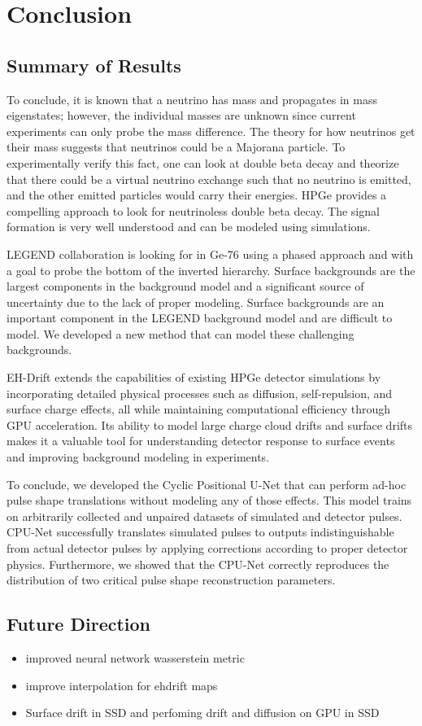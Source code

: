 \chapter{Conclusion}
\section{Summary of Results}
To conclude, it is known that a neutrino has mass and propagates in mass eigenstates; however, the individual masses are unknown since current experiments can only probe the mass difference. The theory for how neutrinos get their mass suggests that neutrinos could be a Majorana particle. To experimentally verify this fact, one can look at double beta decay and theorize that there could be a virtual neutrino exchange such that no neutrino is emitted, and the other emitted particles would carry their energies. HPGe provides a compelling approach to look for neutrinoless double beta decay. The signal formation is very well understood and can be modeled using simulations.

LEGEND collaboration is looking for {\onbb} in Ge-76 using a phased approach and with a goal to probe the bottom of the inverted hierarchy. Surface backgrounds are the largest components in the background model and a significant source of uncertainty due to the lack of proper modeling. Surface backgrounds are an important component in the LEGEND background model and are difficult to model. We developed a new method that can model these challenging backgrounds.

EH-Drift extends the capabilities of existing HPGe detector simulations by incorporating detailed physical processes such as diffusion, self-repulsion, and surface charge effects, all while maintaining computational efficiency through GPU acceleration. Its ability to model large charge cloud drifts and surface drifts makes it a valuable tool for understanding detector response to surface events and improving background modeling in experiments.


To conclude, we developed the Cyclic Positional U-Net that can perform ad-hoc pulse shape translations without modeling any of those effects. This model trains on arbitrarily collected and unpaired datasets of simulated and detector pulses. CPU-Net successfully translates simulated pulses to outputs indistinguishable from actual detector pulses by applying corrections according to proper detector physics. Furthermore, we showed that the CPU-Net correctly reproduces the distribution of two critical pulse shape reconstruction parameters. 


\section{Future Direction}
\begin{itemize}
    \item improved neural network wasserstein metric
    \item improve interpolation for ehdrift maps
    \item Surface drift in SSD and perfoming drift and diffusion on GPU in SSD
\end{itemize}
\label{chap:conclusion}